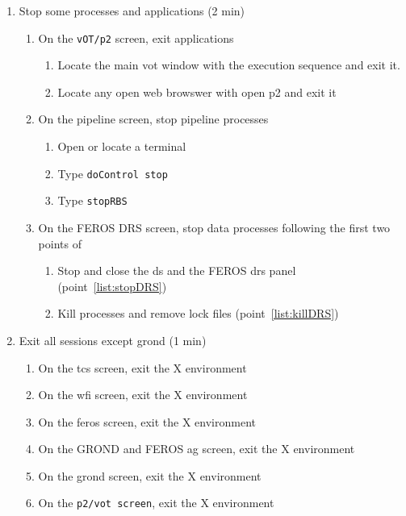 \documentclass[11pt,fleqn,a4paper]{book}
\begin{document}
\label{proc:monthly}
\begin{enumerate}
\item \label{list:soft:stop} Stop some processes and applications (2 min)
  \begin{enumerate}
     \item On the \texttt{vOT/p2} screen, exit applications
     \begin{enumerate}
      \item Locate the main \gls{vot} window with the execution sequence and exit it.
      \item Locate any open web browswer with open \gls{p2} and exit it
     \end{enumerate}
     \item On the pipeline screen, stop pipeline processes
             \begin{enumerate}
                \item Open or locate a terminal
                \item Type \texttt{doControl stop}
                \item Type \texttt{stopRBS}
             \end{enumerate}
     \item On the FEROS DRS screen, stop data processes following the first two points of 
             \begin{enumerate}
                \item Stop and close the \gls{ds} and the FEROS \gls{drs} panel (point~\ref{list:stopDRS})
                \item Kill processes and remove lock files (point~\ref{list:killDRS})
             \end{enumerate}
   \end{enumerate}
\item \label{list:soft:exit} Exit all sessions except \gls{grond} (1 min)
    \begin{enumerate}
        \item On the \gls{tcs} screen, exit the X environment
        \item On the \gls{wfi} screen, exit the X environment
        \item On the \gls{feros} screen, exit the X environment
        \item On the GROND and FEROS \gls{ag} screen, exit the X environment
        \item On the \gls{grond} screen, exit the X environment
        \item On the \texttt{p2/vot screen}, exit the X environment

\end{enumerate}
\end{enumerate}
\end{document}
